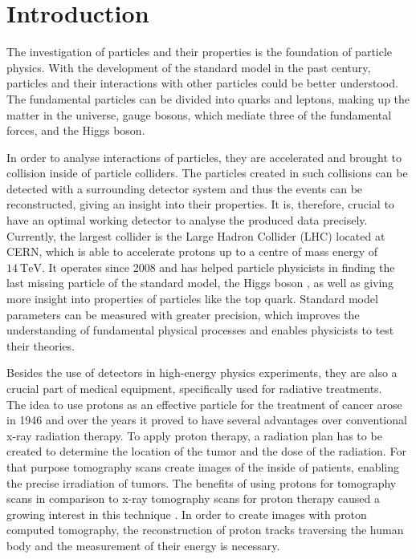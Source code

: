 \chapter{Introduction}
The investigation of particles and their properties is the foundation of particle physics. With the development of the standard model in the past century, particles
and their interactions with other particles could be better understood. The fundamental particles can be divided into quarks and leptons, making up the matter in the universe,
gauge bosons, which mediate three of the fundamental forces, and the Higgs boson.

In order to analyse interactions of particles, they are accelerated and brought to collision inside of particle colliders. The particles created in such collisions
can be detected with a surrounding detector system and thus the events can be reconstructed, giving an insight into their properties. It is, therefore, crucial to have
an optimal working detector to analyse the produced data precisely.
Currently, the largest collider is
the Large Hadron Collider (LHC) \cite{lhc} located at CERN, which is able to accelerate protons up to
a centre of mass energy of $\SI{14}{\tera\eV}$.
It operates since 2008 and has helped particle physicists in finding the last missing particle of the standard model, the Higgs boson \cite{higgs}\cite{higgs_cms}, as well as giving more insight
into properties of particles like the top quark. Standard model parameters can be measured with greater precision, which improves the understanding of fundamental physical processes
and enables physicists to test their theories. %

Besides the use of detectors in high-energy physics experiments, they are also a crucial part of medical equipment, specifically used for radiative treatments. \\
The idea to use protons as an effective particle for the treatment of cancer arose in 1946 \cite{1946} and over the years it proved to have several advantages over
conventional x-ray radiation therapy. To apply proton therapy, a radiation plan has to be created to determine the location of the tumor and the dose of the radiation.
For that purpose tomography scans create images of the inside of patients, enabling the precise irradiation of tumors.
The benefits of using protons for tomography scans in comparison to x-ray tomography scans for proton therapy caused a growing interest in this technique \cite{pbt}.
In order to create images with proton computed tomography, the reconstruction of proton tracks traversing the human body and the measurement of their energy is necessary.


